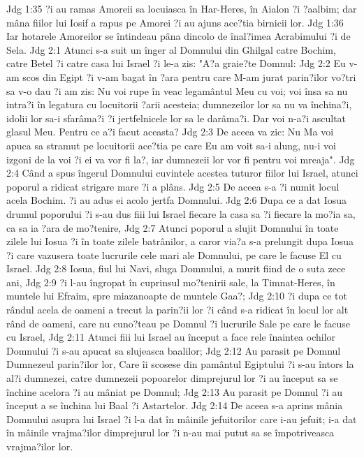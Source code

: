 Jdg 1:35  ?i au ramas Amoreii sa locuiasca în Har-Heres, în Aialon ?i ?aalbim; dar mâna fiilor lui Iosif a rapus pe Amorei ?i au ajuns ace?tia birnicii lor.
Jdg 1:36  Iar hotarele Amoreilor se întindeau pâna dincolo de înal?imea Acrabimului ?i de Sela.
Jdg 2:1  Atunci s-a suit un înger al Domnului din Ghilgal catre Bochim, catre Betel ?i catre casa lui Israel ?i le-a zis: "A?a graie?te Domnul:
Jdg 2:2  Eu v-am scos din Egipt ?i v-am bagat în ?ara pentru care M-am jurat parin?ilor vo?tri sa v-o dau ?i am zis: Nu voi rupe în veac legamântul Meu cu voi; voi însa sa nu intra?i în legatura cu locuitorii ?arii acesteia; dumnezeilor lor sa nu va închina?i, idolii lor sa-i sfarâma?i ?i jertfelnicele lor sa le darâma?i. Dar voi n-a?i ascultat glasul Meu. Pentru ce a?i facut aceasta?
Jdg 2:3  De aceea va zic: Nu Ma voi apuca sa stramut pe locuitorii ace?tia pe care Eu am voit sa-i alung, nu-i voi izgoni de la voi ?i ei va vor fi la?, iar dumnezeii lor vor fi pentru voi mreaja".
Jdg 2:4  Când a spus îngerul Domnului cuvintele acestea tuturor fiilor lui Israel, atunci poporul a ridicat strigare mare ?i a plâns.
Jdg 2:5  De aceea s-a ?i numit locul acela Bochim. ?i au adus ei acolo jertfa Domnului.
Jdg 2:6  Dupa ce a dat Iosua drumul poporului ?i s-au dus fiii lui Israel fiecare la casa sa ?i fiecare la mo?ia sa, ca sa ia ?ara de mo?tenire,
Jdg 2:7  Atunci poporul a slujit Domnului în toate zilele lui Iosua ?i în toate zilele batrânilor, a caror via?a s-a prelungit dupa Iosua ?i care vazusera toate lucrurile cele mari ale Domnului, pe care le facuse El cu Israel.
Jdg 2:8  Iosua, fiul lui Navi, sluga Domnului, a murit fiind de o suta zece ani,
Jdg 2:9  ?i l-au îngropat în cuprinsul mo?tenirii sale, la Timnat-Heres, în muntele lui Efraim, spre miazanoapte de muntele Gaa?;
Jdg 2:10  ?i dupa ce tot rândul acela de oameni a trecut la parin?ii lor ?i când s-a ridicat în locul lor alt rând de oameni, care nu cuno?teau pe Domnul ?i lucrurile Sale pe care le facuse cu Israel,
Jdg 2:11  Atunci fiii lui Israel au început a face rele înaintea ochilor Domnului ?i s-au apucat sa slujeasca baalilor;
Jdg 2:12  Au parasit pe Domnul Dumnezeul parin?ilor lor, Care îi scosese din pamântul Egiptului ?i s-au întors la al?i dumnezei, catre dumnezeii popoarelor dimprejurul lor ?i au început sa se închine acelora ?i au mâniat pe Domnul;
Jdg 2:13  Au parasit pe Domnul ?i au început a se închina lui Baal ?i Astartelor.
Jdg 2:14  De aceea s-a aprins mânia Domnului asupra lui Israel ?i l-a dat în mâinile jefuitorilor care i-au jefuit; i-a dat în mâinile vrajma?ilor dimprejurul lor ?i n-au mai putut sa se împotriveasca vrajma?ilor lor.
